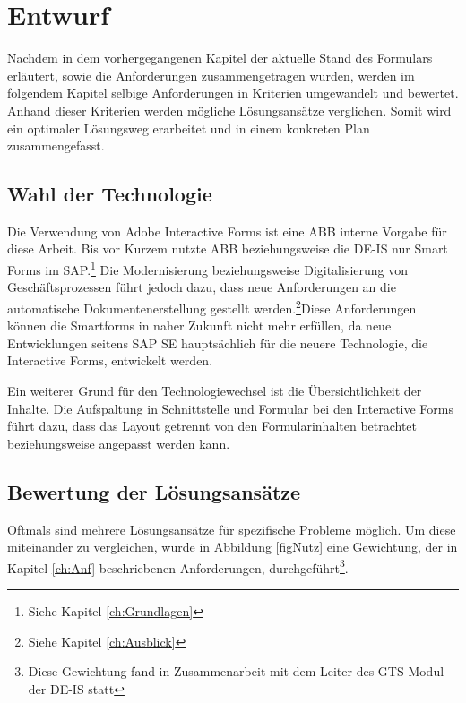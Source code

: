 \chapter{Entwurf}

Nachdem in dem vorhergegangenen Kapitel der aktuelle Stand des Formulars erläutert, sowie die Anforderungen zusammengetragen wurden, werden im folgendem Kapitel selbige Anforderungen in Kriterien umgewandelt und bewertet. Anhand dieser Kriterien werden mögliche Lösungsansätze verglichen. Somit wird ein optimaler Lösungsweg erarbeitet und in einem konkreten Plan zusammengefasst.

\section{Wahl der Technologie}
\label{ch:Techn}

Die Verwendung von Adobe Interactive Forms ist eine ABB interne Vorgabe für diese Arbeit. Bis vor Kurzem nutzte ABB beziehungsweise die DE-IS nur Smart Forms im SAP.\footnote{Siehe Kapitel \ref{ch:Grundlagen}} Die Modernisierung beziehungsweise Digitalisierung von Geschäftsprozessen führt jedoch dazu, dass neue Anforderungen an die automatische Dokumentenerstellung gestellt werden.\footnote{Siehe Kapitel \ref{ch:Ausblick}}Diese Anforderungen können die Smartforms in naher Zukunft nicht mehr erfüllen, da neue Entwicklungen seitens SAP SE hauptsächlich für die neuere Technologie, die Interactive Forms, entwickelt werden.

Ein weiterer Grund für den Technologiewechsel ist die Übersichtlichkeit der Inhalte. Die Aufspaltung in Schnittstelle und Formular bei den Interactive Forms führt dazu, dass das Layout getrennt von den Formularinhalten betrachtet beziehungsweise angepasst werden kann. 


\section{Bewertung der Lösungsansätze}
\label{ch:Bewertung}

Oftmals sind mehrere Lösungsansätze für spezifische Probleme möglich. Um diese miteinander zu vergleichen, wurde in Abbildung \ref{figNutz} eine Gewichtung, der in Kapitel \ref{ch:Anf} beschriebenen Anforderungen, durchgeführt\footnote{Diese Gewichtung fand in Zusammenarbeit mit dem  Leiter des GTS-Modul  der DE-IS statt}. 

